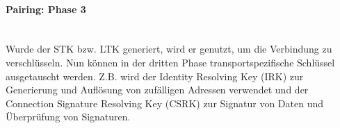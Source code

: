 \paragraph{Pairing: Phase 3} \mbox{} \vspace{0.2cm} \\
Wurde der STK bzw. LTK generiert, wird er genutzt, um die Verbindung zu verschlüsseln. Nun können in der dritten Phase transportspezifische Schlüssel ausgetauscht werden. Z.B. wird der Identity Resolving Key (IRK) zur Generierung und Auflösung von zufälligen Adressen verwendet und der Connection Signature Resolving Key (CSRK) zur Signatur von Daten und Überprüfung von Signaturen.




